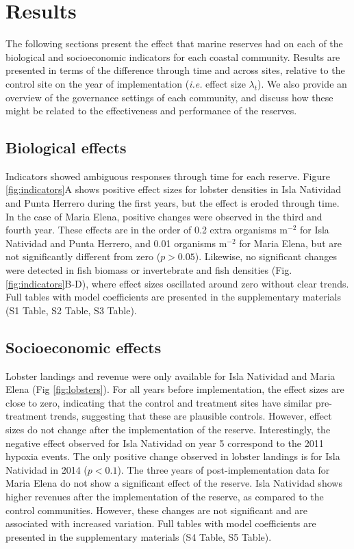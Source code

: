 \documentclass{frontiersSCNS}
\begin{document}
\hypertarget{results}{%
\section{Results}\label{results}}

The following sections present the effect that marine reserves had on
each of the biological and socioeconomic indicators for each coastal
community. Results are presented in terms of the difference through time
and across sites, relative to the control site on the year of
implementation (\emph{i.e.} effect size \(\lambda_t\)). We also provide
an overview of the governance settings of each community, and discuss
how these might be related to the effectiveness and performance of the
reserves.

\hypertarget{biological-effects}{%
\subsection{Biological effects}\label{biological-effects}}

Indicators showed ambiguous responses through time for each reserve.
Figure \ref{fig:indicators}A shows positive effect sizes for lobster
densities in Isla Natividad and Punta Herrero during the first years,
but the effect is eroded through time. In the case of Maria Elena,
positive changes were observed in the third and fourth year. These
effects are in the order of 0.2 extra organisms \(\mathrm{m}^{-2}\) for
Isla Natividad and Punta Herrero, and 0.01 organisms \(\mathrm{m}^{-2}\)
for Maria Elena, but are not significantly different from zero
(\(p > 0.05\)). Likewise, no significant changes were detected in fish
biomass or invertebrate and fish densities (Fig.
\ref{fig:indicators}B-D), where effect sizes oscillated around zero
without clear trends. Full tables with model coefficients are presented
in the supplementary materials (S1 Table, S2 Table, S3 Table).

\hypertarget{socioeconomic-effects}{%
\subsection{Socioeconomic effects}\label{socioeconomic-effects}}

Lobster landings and revenue were only available for Isla Natividad and
Maria Elena (Fig \ref{fig:lobsters}). For all years before
implementation, the effect sizes are close to zero, indicating that the
control and treatment sites have similar pre-treatment trends,
suggesting that these are plausible controls. However, effect sizes do
not change after the implementation of the reserve. Interestingly, the
negative effect observed for Isla Natividad on year 5 correspond to the
2011 hypoxia events. The only positive change observed in lobster
landings is for Isla Natividad in 2014 (\(p < 0.1\)). The three years of
post-implementation data for Maria Elena do not show a significant
effect of the reserve. Isla Natividad shows higher revenues after the
implementation of the reserve, as compared to the control communities.
However, these changes are not significant and are associated with
increased variation. Full tables with model coefficients are presented
in the supplementary materials (S4 Table, S5 Table).
\end{document}
